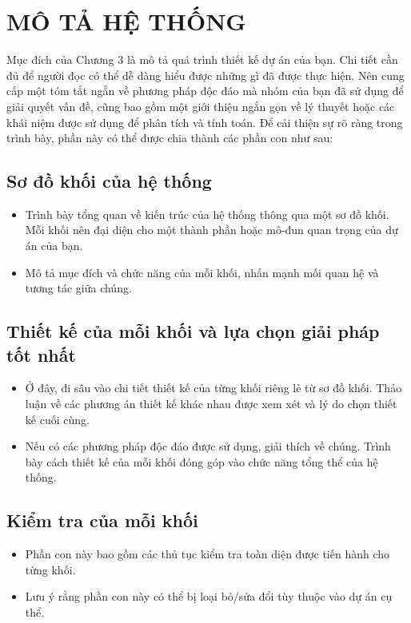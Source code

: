 \chapter{MÔ TẢ HỆ THỐNG}
Mục đích của Chương 3 là mô tả quá trình thiết kế dự án của bạn. Chi tiết cần đủ để người đọc có thể dễ dàng hiểu được những gì đã được thực hiện. Nên cung cấp một tóm tắt ngắn về phương pháp độc đáo mà nhóm của bạn đã sử dụng để giải quyết vấn đề, cũng bao gồm một giới thiệu ngắn gọn về lý thuyết hoặc các khái niệm được sử dụng để phân tích và tính toán. Để cải thiện sự rõ ràng trong trình bày, phần này có thể được chia thành các phần con như sau:

\section{Sơ đồ khối của hệ thống}
\begin{itemize}
\item Trình bày tổng quan về kiến trúc của hệ thống thông qua một sơ đồ khối. Mỗi khối nên đại diện cho một thành phần hoặc mô-đun quan trọng của dự án của bạn.
\item Mô tả mục đích và chức năng của mỗi khối, nhấn mạnh mối quan hệ và tương tác giữa chúng.
\end{itemize}

\section{Thiết kế của mỗi khối và lựa chọn giải pháp tốt nhất}
\begin{itemize}
\item Ở đây, đi sâu vào chi tiết thiết kế của từng khối riêng lẻ từ sơ đồ khối. Thảo luận về các phương án thiết kế khác nhau được xem xét và lý do chọn thiết kế cuối cùng.
\item Nếu có các phương pháp độc đáo được sử dụng, giải thích về chúng. Trình bày cách thiết kế của mỗi khối đóng góp vào chức năng tổng thể của hệ thống.
\end{itemize}

\section{Kiểm tra của mỗi khối}
\begin{itemize}
\item Phần con này bao gồm các thủ tục kiểm tra toàn diện được tiến hành cho từng khối.
\item Lưu ý rằng phần con này có thể bị loại bỏ/sửa đổi tùy thuộc vào dự án cụ thể.
\end{itemize}

